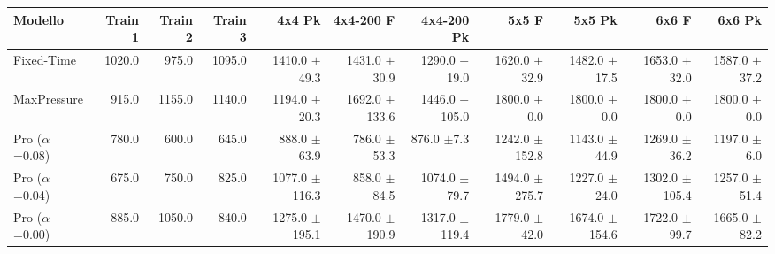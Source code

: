 \begin{table}
  \centering
  \tiny
  \begin{tabular}{@{}lrrrrrrrrrr@{}}
    \toprule
    Modello                   & Train 1 & Train 2 & Train 3 & 4x4 Pk                                        & 4x4-200 F                                     & 4x4-200 Pk                                    & 5x5 F                                         & 5x5 Pk                                        & 6x6 F                                         & 6x6 Pk                                        \\
    \midrule
    Fixed-Time                & 1020.0  & 975.0   & 1095.0  & 1410.0 {\fontsize{4}{4}\selectfont$\pm$49.3}  & 1431.0 {\fontsize{4}{4}\selectfont$\pm$30.9}  & 1290.0 {\fontsize{4}{4}\selectfont$\pm$19.0}  & 1620.0 {\fontsize{4}{4}\selectfont$\pm$32.9}  & 1482.0 {\fontsize{4}{4}\selectfont$\pm$17.5}  & 1653.0 {\fontsize{4}{4}\selectfont$\pm$32.0}  & 1587.0 {\fontsize{4}{4}\selectfont$\pm$37.2}  \\
    MaxPressure               & 915.0   & 1155.0  & 1140.0  & 1194.0 {\fontsize{4}{4}\selectfont$\pm$20.3}  & 1692.0 {\fontsize{4}{4}\selectfont$\pm$133.6} & 1446.0 {\fontsize{4}{4}\selectfont$\pm$105.0} & 1800.0 {\fontsize{4}{4}\selectfont$\pm$0.0}   & 1800.0 {\fontsize{4}{4}\selectfont$\pm$0.0}   & 1800.0 {\fontsize{4}{4}\selectfont$\pm$0.0}   & 1800.0 {\fontsize{4}{4}\selectfont$\pm$0.0}   \\
    Pro ($\alpha$=0.08)       & 780.0   & 600.0   & 645.0   & 888.0 {\fontsize{4}{4}\selectfont$\pm$63.9}   & 786.0 {\fontsize{4}{4}\selectfont$\pm$53.3}   & 876.0 {\fontsize{4}{4}\selectfont$\pm$7.3}    & 1242.0 {\fontsize{4}{4}\selectfont$\pm$152.8} & 1143.0 {\fontsize{4}{4}\selectfont$\pm$44.9}  & 1269.0 {\fontsize{4}{4}\selectfont$\pm$36.2}  & 1197.0 {\fontsize{4}{4}\selectfont$\pm$6.0}   \\
    Pro ($\alpha$=0.04)       & 675.0   & 750.0   & 825.0   & 1077.0 {\fontsize{4}{4}\selectfont$\pm$116.3} & 858.0 {\fontsize{4}{4}\selectfont$\pm$84.5}   & 1074.0 {\fontsize{4}{4}\selectfont$\pm$79.7}  & 1494.0 {\fontsize{4}{4}\selectfont$\pm$275.7} & 1227.0 {\fontsize{4}{4}\selectfont$\pm$24.0}  & 1302.0 {\fontsize{4}{4}\selectfont$\pm$105.4} & 1257.0 {\fontsize{4}{4}\selectfont$\pm$51.4}  \\
    Pro ($\alpha$=0.00)       & 885.0   & 1050.0  & 840.0   & 1275.0 {\fontsize{4}{4}\selectfont$\pm$195.1} & 1470.0 {\fontsize{4}{4}\selectfont$\pm$190.9} & 1317.0 {\fontsize{4}{4}\selectfont$\pm$119.4} & 1779.0 {\fontsize{4}{4}\selectfont$\pm$42.0}  & 1674.0 {\fontsize{4}{4}\selectfont$\pm$154.6} & 1722.0 {\fontsize{4}{4}\selectfont$\pm$99.7}  & 1665.0 {\fontsize{4}{4}\selectfont$\pm$82.2}  \\

\end{tabular}
\end{table}
